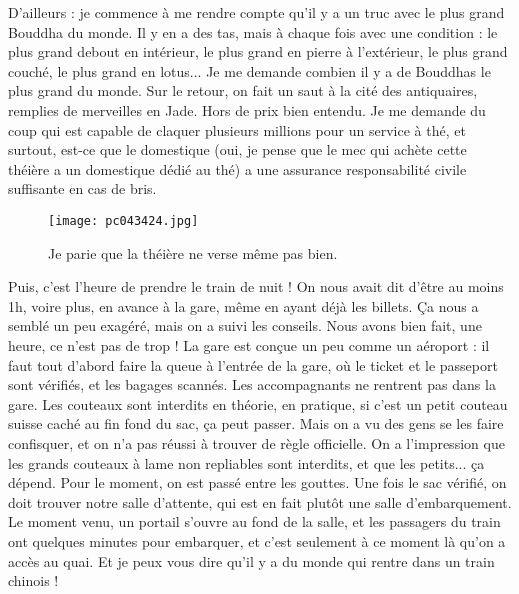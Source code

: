 \documentclass{book}
\begin{document}
D'ailleurs : je commence à me rendre compte qu'il y a un truc avec le plus grand Bouddha du monde. Il y en a des tas, mais à chaque fois avec une condition : le plus grand debout en intérieur, le plus grand en pierre à l'extérieur, le plus grand couché, le plus grand en lotus... Je me demande combien il y a de Bouddhas le plus grand du monde.
Sur le retour, on fait un saut à la cité des antiquaires, remplies de merveilles en Jade. Hors de prix bien entendu. Je me demande du coup qui est capable de claquer plusieurs millions pour un service à thé, et surtout, est-ce que le domestique (oui, je pense que le mec qui achète cette théière a un domestique dédié au thé) a une assurance responsabilité civile suffisante en cas de bris.


\begin{figure}[H]
\centering
\texttt{[image: pc043424.jpg]}
\caption*{ Je parie que la théière ne verse même pas bien.}
\end{figure}

Puis, c'est l'heure de prendre le train de nuit ! On nous avait dit d'être au moins 1h, voire plus, en avance à la gare, même en ayant déjà les billets. Ça nous a semblé un peu exagéré, mais on a suivi les conseils. Nous avons bien fait, une heure, ce n'est pas de trop ! La gare est conçue un peu comme un aéroport : il faut tout d'abord faire la queue à l'entrée de la gare, où le ticket et le passeport sont vérifiés, et les bagages scannés. Les accompagnants ne rentrent pas dans la gare. Les couteaux sont interdits en théorie, en pratique, si c'est un petit couteau suisse caché au fin fond du sac, ça peut passer. Mais on a vu des gens se les faire confisquer, et on n'a pas réussi à trouver de règle officielle. On a l'impression que les grands couteaux à lame non repliables sont interdits, et que les petits... ça dépend. Pour le moment, on est passé entre les gouttes. Une fois le sac vérifié, on doit trouver notre salle d'attente, qui est en fait plutôt une salle d'embarquement. Le moment venu, un portail s'ouvre au fond de la salle, et les passagers du train ont quelques minutes pour embarquer, et c'est seulement à ce moment là qu'on a accès au quai. Et je peux vous dire qu'il y a du monde qui rentre dans un train chinois !
\end{document}
